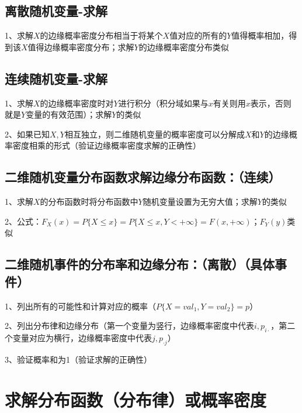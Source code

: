 \subsection{离散随机变量-求解}

1、求解$X$的边缘概率密度分布相当于将某个$X$值对应的所有的$Y$值得概率相加，得到该$X$值得边缘概率密度分布；求解$Y$的边缘概率密度分布类似



\subsection{连续随机变量-求解}

1、求解$X$的边缘概率密度时对$Y$进行积分（积分域如果与$x$有关则用$x$表示，否则就是$Y$变量的有效范围）；求解$Y$的类似

2、如果已知$X,Y$相互独立，则二维随机变量的概率密度可以分解成$X$和$Y$的边缘概率密度相乘的形式（验证边缘概率密度求解的正确性）



\subsection{二维随机变量分布函数求解边缘分布函数：（连续）}

1、求解$X$的分布函数时将分布函数中$Y$随机变量设置为无穷大值；求解$Y$的类似

2、公式：$F_X(x)=P\{X \le x\} = P\{X \le x,Y<+\infty\} = F(x, +\infty)$；$F_Y(y)$类似



\subsection{二维随机事件的分布率和边缘分布：（离散）（具体事件）}

1、列出所有的可能性和计算对应的概率（$P\{X=val_1,Y=val_2\} = p$）

2、列出分布律和边缘分布（第一个变量为竖行，边缘概率密度中代表$i,p_{i\cdot}$，第二个变量对应为横行，边缘概率密度中代表$j,p_{\cdot j}$）

3、验证概率和为1（验证求解的正确性）

\section{求解分布函数（分布律）或概率密度}



